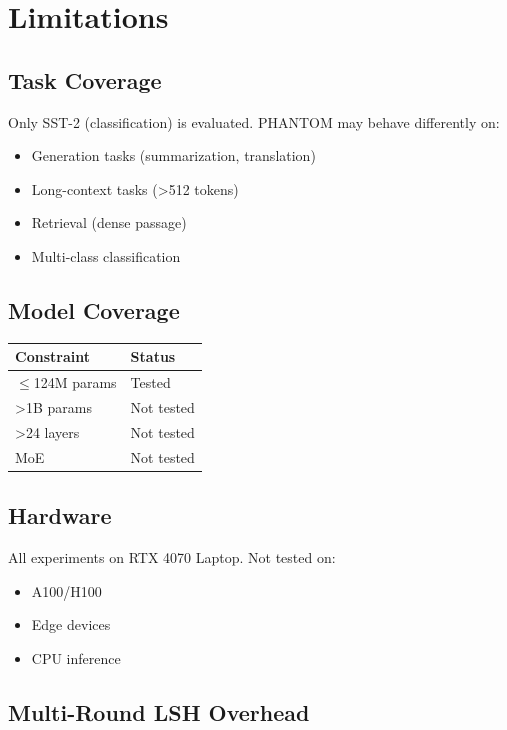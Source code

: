 
\section{Limitations}

\subsection{Task Coverage}

Only SST-2 (classification) is evaluated. PHANTOM may behave differently on:
\begin{itemize}
\item Generation tasks (summarization, translation)
\item Long-context tasks (\textgreater{}512 tokens)
\item Retrieval (dense passage)
\item Multi-class classification

\end{itemize}
\subsection{Model Coverage}

\begin{table}[H]
\centering
\small
\begin{tabular}{ll}
\toprule
\textbf{Constraint} & \textbf{Status} \\
\midrule
$\le$124M params & Tested \\
\textgreater{}1B params & Not tested \\
\textgreater{}24 layers & Not tested \\
MoE & Not tested \\
\bottomrule
\end{tabular}
\end{table}

\subsection{Hardware}

All experiments on RTX 4070 Laptop. Not tested on:
\begin{itemize}
\item A100/H100
\item Edge devices
\item CPU inference

\end{itemize}
\subsection{Multi-Round LSH Overhead}

